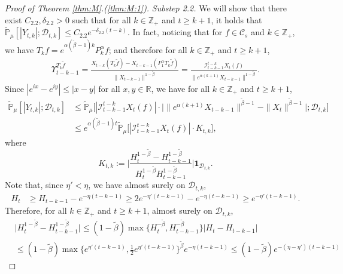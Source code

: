 \documentclass[12pt,a4paper]{amsart}
\theoremstyle{plain}
\theoremstyle{definition}
\numberwithin{equation}{section}
\begin{document}
\begin{proof}[Proof of Theorem \ref{thm:M}.(\ref{thm:M:1})]
  \emph{Substep 2.2.} We will show that there exist $C_{2.2},\delta_{2.2} > 0$ such that for all $k\in \mathbb Z_+$ and $t\geq k+1$, it holds that $ \mathbb{\widetilde{P}}_{\mu} [|Y_{t,k}|;\mathcal{D}_{t,k}] \leq  C_{2.2} e^{-\delta_{2.2} (t-k)}$.
  In fact, noticing that for $f\in \mathcal C_s$ and $k\in \mathbb Z_+$, we have $T_kf = e^{\alpha (\tilde \beta - 1 )k}P_k^\alpha f $; and therefore for all $k\in \mathbb Z_+$ and $t \geq k + 1$,
  \begin{align}
    \label{eq:gammafunction11}
    \Upsilon_{t-k-1}^{T_{k} \tilde f}
    = \frac{X_{t-k}(T_{k} \tilde  f) - X_{t -k-1}(P_1^\alpha T_{k} \tilde f)}{\|X_{t-k-1}\|^{1-\tilde \beta}}
    = \frac{\mathcal I_{t - k - 1}^{t - k} X_t(f)}{\|e^{\alpha (k+1)}X_{t-k-1} \|^{1 -\tilde \beta}}.
  \end{align}
  Since $|e^{ix}-e^{iy}|\leq|x-y|$ for all $x,y\in \mathbb R$, we have for all $k \in \mathbb Z_+$ and $t\geq k+1$,
  \begin{align}
    \label{eq: control of Ykt}
    \mathbb{\widetilde{P}}_{\mu}[|Y_{t,k}|;\mathcal{D}_{t,k}]
    & \leq \mathbb{\widetilde{P}}_{\mu}\Big[|\mathcal I_{t-k-1}^{t-k} X_t(f) | \cdot \Big| \| e^{\alpha(k+1)}X_{t-k-1}\| ^{ \tilde \beta - 1} - \|X_t\|^{ \tilde \beta - 1}\Big|; \mathcal D_{t,k}\Big] \\
    & \leq  e^{\alpha(\tilde \beta - 1)t}\mathbb{\widetilde{P}}_{\mu}\big[|\mathcal I_{t-k-1}^{t-k}X_t(f)|\cdot K_{t,k}\big],
  \end{align}
  where
  \[
    K_{t,k}
    := \Big| \frac {H_t^{1- \tilde \beta} - H_{t-k-1}^{1 - \tilde \beta}} {H_t^{1 - \tilde \beta} H_{t-k-1}^{ 1- \tilde \beta }} \Big| \mathbf{1}_{\mathcal{D}_{t,k}}.
  \]
  Note that, since $\eta' < \eta$, we have almost surely on $\mathcal D_{t,k}$,
  \begin{align}
    H_t
    & \geq H_{t-k-1}- e^{-\eta (t-k-1)}
      \geq 2e^{-\eta'(t-k-1)}-e^{-\eta(t-k-1)}
      \geq e^{-\eta'(t-k-1)}.
  \end{align}
  Therefore, for all $k \in \mathbb Z_+$ and $t\geq k+1$, almost surely  on $\mathcal D_{t,k}$,
  \begin{align}
    & \Big|H_t^{1- \tilde \beta}-H_{t-k-1}^{1- \tilde \beta}\Big|
      \leq (1- \tilde \beta) \max \{ H_t^{-\tilde \beta }, H_{t-k-1}^{ -\tilde \beta} \} | H_t - H_{t-k-1} | \\
    & \leq (1- \tilde \beta ) \max\{e^{\eta' (t-k-1)}, \frac{1}{2}e^{\eta'(t-k-1)}\}^{\tilde \beta} e^{-\eta(t-k-1)}  \leq (1- \tilde \beta) e^{-(\eta - \eta') (t-k-1)}
  \end{align}

\end{proof}
\end{document}
